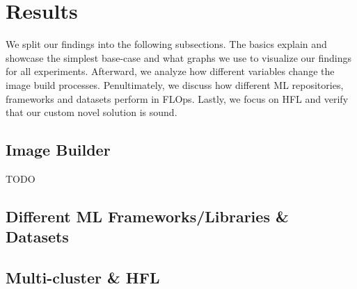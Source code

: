 \section{Results}

We split our findings into the following subsections.
The basics explain and showcase the simplest base-case and what graphs we use to visualize our findings for all experiments.
Afterward, we analyze how different variables change the image build processes.
Penultimately, we discuss how different ML repositories, frameworks and datasets perform in FLOps.
Lastly, we focus on HFL and verify that our custom novel solution is sound.



\subsection{Image Builder}
TODO

\subsection{Different ML Frameworks/Libraries \& Datasets}


\subsection{Multi-cluster \& HFL}